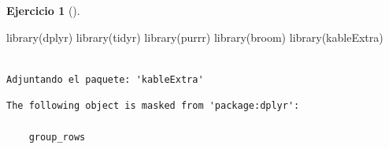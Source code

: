 \documentclass[
  spanish,
  a4paper,
]{scrreport}
\newenvironment{Shaded}{\begin{snugshade}}{\end{snugshade}}
\newcommand{\FunctionTok}[1]{\textcolor[rgb]{0.28,0.35,0.67}{#1}}
\newcommand{\NormalTok}[1]{\textcolor[rgb]{0.00,0.23,0.31}{#1}}
\theoremstyle{definition}
\newtheorem{exercise}{Ejercicio}[chapter]
\theoremstyle{remark}
\begin{document}
\begin{exercise}[]
\begin{enumerate}
\begin{tcolorbox}
\begin{Shaded}
\begin{Highlighting}[]
\FunctionTok{library}\NormalTok{(dplyr)}
\FunctionTok{library}\NormalTok{(tidyr)}
\FunctionTok{library}\NormalTok{(purrr)}
\FunctionTok{library}\NormalTok{(broom)}
\FunctionTok{library}\NormalTok{(kableExtra)}
\end{Highlighting}
\end{Shaded}

\begin{verbatim}

Adjuntando el paquete: 'kableExtra'
\end{verbatim}

\begin{verbatim}
The following object is masked from 'package:dplyr':

    group_rows
\end{verbatim}


\end{tcolorbox}
\end{enumerate}
\end{exercise}
\end{document}
